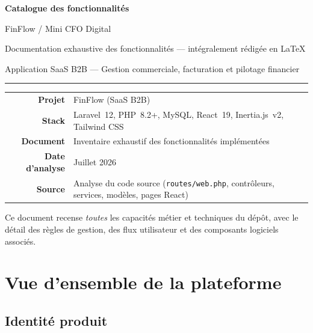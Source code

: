\documentclass[11pt,a4paper]{report}
\newcommand{\route}[1]{\texttt{\small #1}}
\begin{document}
\begin{titlepage}
    \centering
    \vspace*{1.5cm}
    {\Huge\bfseries\color{finblue} Catalogue des fonctionnalités\par}
    \vspace{0.8cm}
    {\LARGE FinFlow / Mini CFO Digital\par}
    \vspace{0.5cm}
    {\large Documentation exhaustive des fonctionnalités — intégralement rédigée en \LaTeX\par}
    \vspace{0.3cm}
    {\normalsize Application SaaS B2B — Gestion commerciale, facturation et pilotage financier\par}
    \vspace{1.5cm}
    \rule{0.75\textwidth}{1pt}
    \vspace{1.2cm}
    \begin{tabular}{>{\bfseries}r p{9cm}}
        Projet & FinFlow (SaaS B2B) \\
        Stack & Laravel~12, PHP~8.2+, MySQL, React~19, Inertia.js~v2, Tailwind CSS \\
        Document & Inventaire exhaustif des fonctionnalités implémentées \\
        Date d'analyse & Juillet 2026 \\
        Source & Analyse du code source (\route{routes/web.php}, contrôleurs, services, modèles, pages React) \\
    \end{tabular}
    \vfill
    {\normalsize Ce document recense \emph{toutes} les capacités métier et techniques du dépôt, avec le détail des règles de gestion, des flux utilisateur et des composants logiciels associés.\par}
\end{titlepage}

\tableofcontents
\cleardoublepage

\chapter{Vue d'ensemble de la plateforme}

\section{Identité produit}
\end{document}
